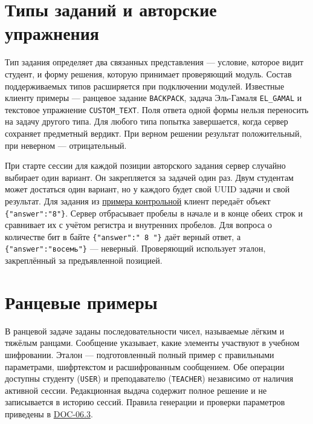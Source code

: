 \documentclass[12pt,a4paper]{article}
\begin{document}
\section{Типы заданий и авторские упражнения}\label{ux442ux438ux43fux44b-ux437ux430ux434ux430ux43dux438ux439-ux438-ux430ux432ux442ux43eux440ux441ux43aux438ux435-ux443ux43fux440ux430ux436ux43dux435ux43dux438ux44f}

\hypertarget{типы-заданий-и-авторские-упражнения}{}

Тип задания определяет два связанных представления --- условие, которое видит студент, и форму решения, которую принимает проверяющий модуль. Состав поддерживаемых типов расширяется при подключении модулей. Известные клиенту примеры --- ранцевое задание \texttt{BACKPACK}, задача Эль-Гамаля \texttt{EL\_GAMAL} и текстовое упражнение \texttt{CUSTOM\_\allowbreak{}TEXT}. Поля ответа одной формы нельзя переносить на задачу другого типа. Для любого типа попытка завершается, когда сервер сохраняет предметный вердикт. При верном решении результат положительный, при неверном --- отрицательный.

При старте сессии для каждой позиции авторского задания сервер случайно выбирает один вариант. Он закрепляется за задачей один раз. Двум студентам может достаться один вариант, но у каждого будет свой UUID задачи и свой результат. Для задания из {\hyperlink{каталог-типов-и-банк-преподавателя}{примера контрольной}} клиент передаёт объект \texttt{\{"answer":"8"\}}. Сервер отбрасывает пробелы в начале и в конце обеих строк и сравнивает их с учётом регистра и внутренних пробелов. Для вопроса о количестве бит в байте \texttt{\{"answer":"\ 8\ "\}} даёт верный ответ, а \texttt{\{"answer":"восемь"\}} --- неверный. Проверяющий использует эталон, закреплённый за предъявленной позицией.

\section{Ранцевые примеры}\label{ux440ux430ux43dux446ux435ux432ux44bux435-ux43fux440ux438ux43cux435ux440ux44b}

\hypertarget{ранцевые-примеры}{}

В ранцевой задаче заданы последовательности чисел, называемые лёгким и тяжёлым ранцами. Сообщение указывает, какие элементы участвуют в учебном шифровании. Эталон --- подготовленный полный пример с правильными параметрами, шифртекстом и расшифрованным сообщением. Обе операции доступны студенту (\texttt{USER}) и преподавателю (\texttt{TEACHER}) независимо от наличия активной сессии. Редакционная выдача содержит полное решение и не записывается в историю сессий. Правила генерации и проверки параметров приведены в {\href{../07\_Программные\_требования/DOC-06.3\_Ранцевые\_криптосистемы.pdf\#doc-063-ранцевые-криптосистемы}{DOC-06.3}}.
\end{document}
